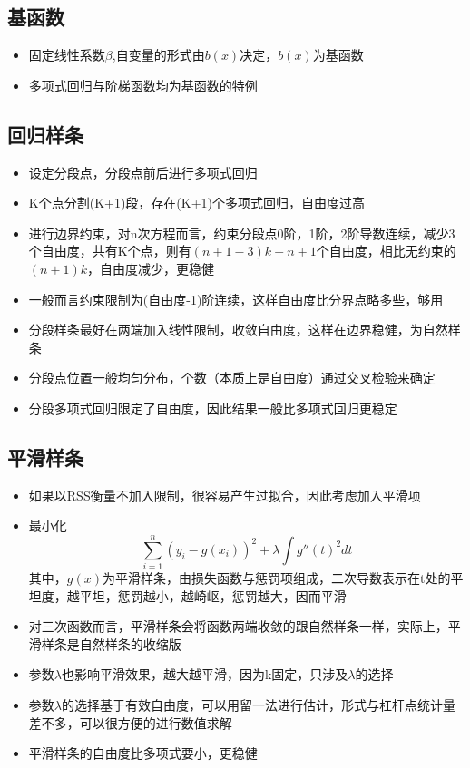 \documentclass[]{book}
\providecommand{\tightlist}{%
  \setlength{\itemsep}{0pt}\setlength{\parskip}{0pt}}
\begin{document}
\hypertarget{ux57faux51fdux6570}{%
\subsection{基函数}\label{ux57faux51fdux6570}}

\begin{itemize}
\tightlist
\item
  固定线性系数\(\beta\),自变量的形式由\(b(x)\)决定，\(b(x)\)为基函数
\item
  多项式回归与阶梯函数均为基函数的特例
\end{itemize}

\hypertarget{ux56deux5f52ux6837ux6761}{%
\subsection{回归样条}\label{ux56deux5f52ux6837ux6761}}

\begin{itemize}
\tightlist
\item
  设定分段点，分段点前后进行多项式回归
\item
  K个点分割(K+1)段，存在(K+1)个多项式回归，自由度过高
\item
  进行边界约束，对n次方程而言，约束分段点0阶，1阶，2阶导数连续，减少3个自由度，共有K个点，则有\((n+1-3)k + n + 1\)个自由度，相比无约束的\((n+1)k\)，自由度减少，更稳健
\item
  一般而言约束限制为(自由度-1)阶连续，这样自由度比分界点略多些，够用
\item
  分段样条最好在两端加入线性限制，收敛自由度，这样在边界稳健，为自然样条
\item
  分段点位置一般均匀分布，个数（本质上是自由度）通过交叉检验来确定
\item
  分段多项式回归限定了自由度，因此结果一般比多项式回归更稳定
\end{itemize}

\hypertarget{ux5e73ux6ed1ux6837ux6761}{%
\subsection{平滑样条}\label{ux5e73ux6ed1ux6837ux6761}}

\begin{itemize}
\tightlist
\item
  如果以RSS衡量不加入限制，很容易产生过拟合，因此考虑加入平滑项
\item
  最小化 \[ \sum_{i = 1}^n (y_{i} - g(x_i))^2 + \lambda \int g''(t)^2 dt \] 其中，\(g(x)\)为平滑样条，由损失函数与惩罚项组成，二次导数表示在t处的平坦度，越平坦，惩罚越小，越崎岖，惩罚越大，因而平滑
\item
  对三次函数而言，平滑样条会将函数两端收敛的跟自然样条一样，实际上，平滑样条是自然样条的收缩版
\item
  参数\(\lambda\)也影响平滑效果，越大越平滑，因为k固定，只涉及\(\lambda\)的选择
\item
  参数\(\lambda\)的选择基于有效自由度，可以用留一法进行估计，形式与杠杆点统计量差不多，可以很方便的进行数值求解
\item
  平滑样条的自由度比多项式要小，更稳健
\end{itemize}
\end{document}
